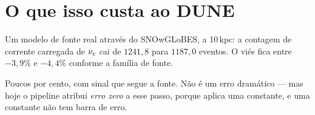 \section{O que isso custa ao DUNE}

Um modelo de fonte real através do SNOwGLoBES,  a 10\,kpc: a
contagem de corrente carregada de $\nu_e$ cai de $1241{,}8$ para $1187{,}0$
eventos. O viés fica entre $-3{,}9\%$ e $-4{,}4\%$ conforme a família de fonte.

Poucos por cento, com sinal que segue a fonte. Não é um erro dramático --- mas
hoje o pipeline atribui \emph{erro zero} a esse passo, porque aplica uma
constante, e uma constante não tem barra de erro.
